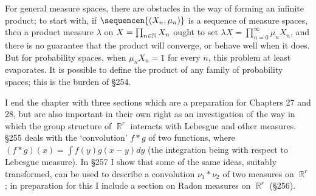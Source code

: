 For general measure spaces, there are obstacles in the way of forming an
infinite product;  to start with, if $\sequencen{(X_n,\mu_n)}$ is a
sequence of measure spaces, then a product measure $\lambda$ on
$X=\prod_{n\in\Bbb N}X_n$ ought to set $\lambda
X=\prod_{n=0}^{\infty}\mu_nX_n$, and there is no guarantee that the
product will converge, or behave well when it does.   But for
probability spaces, when $\mu_nX_n=1$ for every $n$, this problem at
least evaporates.   It is possible to define the product of any family
of probability spaces;  this is the burden of \S254.

I end the chapter with three sections which are a preparation for
Chapters
27 and 28, but are also important in their own right as an investigation
of the way in which the group structure of $\BbbR^r$ interacts with
Lebesgue and other measures.   \S255 deals with the `convolution'
$f*g$ of two functions, where $(f*g)(x)=\int f(y)g(x-y)dy$ (the
integration being with respect to Lebesgue measure).   In \S257 I show
that some of the same ideas, suitably transformed, can be used to
describe a convolution $\nu_1*\nu_2$ of two measures on $\BbbR^r$;  in
preparation for this I include a section on Radon measures on $\BbbR^r$
(\S256).

\discrpage

